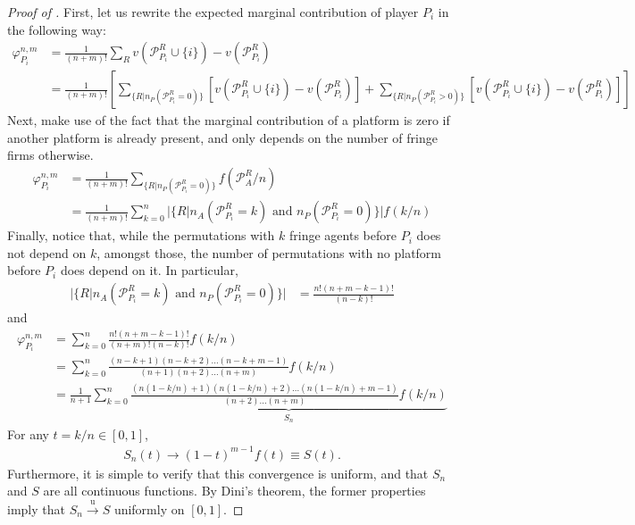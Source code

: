 \documentclass[a4paper]{article}
\begin{document}
\begin{proof}[Proof of ]
    \label{prop:one_sided_multiple}
    First, let us rewrite the expected marginal contribution of player $P_i$ in the following way:
    \begin{align*}
        \varphi_{P_i}^{n, m} &= \frac{1}{(n+m)!} \sum_R v(\mathcal{P}_{P_i}^R \cup \{i\}) - v(\mathcal{P}_{P_i}^R) \\
        &= \frac{1}{(n+m)!} \left[ \sum_{\{R | n_P(\mathcal{P}_{P_i}^R = 0)\}} \left[v(\mathcal{P}_{P_i}^R \cup \{i\}) - v(\mathcal{P}_{P_i}^R)\right] + \sum_{\{R | n_P(\mathcal{P}_{P_i}^R > 0)\}} \left[v(\mathcal{P}_{P_i}^R \cup \{i\}) - v(\mathcal{P}_{P_i}^R)\right] \right]
    \end{align*}
    Next, make use of the fact that the marginal contribution of a platform is zero if another platform is already present, and only depends on the number of fringe firms otherwise.
    \begin{align*}
        \varphi_{P_i}^{n, m} &= \frac{1}{(n+m)!} \sum_{\{R | n_P(\mathcal{P}_{P_i}^R = 0)\}} f (\mathcal{P}_{A}^R / n) \\
        &= \frac{1}{(n+m)!} \sum_{k=0}^n |\{R | n_A(\mathcal{P}^R_{P_i} = k) \text{ and } n_P(\mathcal{P}^R_{P_i} = 0)\}| f(k/n)
    \end{align*}
    Finally, notice that, while the permutations with $k$ fringe agents before $P_i$ does not depend on $k$, amongst those, the number of permutations with no platform before $P_i$ does depend on it.
    In particular,
    \begin{align*}
        |\{R | n_A(\mathcal{P}^R_{P_i} = k) \text{ and } n_P(\mathcal{P}^R_{P_i} = 0)\}| &= \frac{n!(n+m-k-1)!}{(n-k)!}
    \end{align*}
    and
    \begin{align*}
        \varphi_{P_i}^{n, m} &= \sum_{k=0}^n \frac{n!(n+m-k-1)!}{(n+m)!(n-k)!} f(k/n) \\
        &= \sum_{k=0}^n \frac{(n-k+1)(n-k+2) \dots (n-k+m-1)}{(n+1)(n+2) \dots (n+m)} f(k/n) \\
        &= \frac{1}{n+1}\sum_{k=0}^n \underbrace{\frac{(n(1-k/n)+1)(n(1-k/n)+2) \dots (n(1-k/n)+m-1)}{(n+2) \dots (n+m)} f(k/n)}_{S_n}
    \end{align*}
    For any $t = k/n \in [0, 1]$, 
    \begin{align*}
        S_n(t) \to (1-t)^{m-1}f(t) \equiv S(t).
    \end{align*}
    Furthermore, it is simple to verify that this convergence is uniform, and that $S_n$ and $S$ are all continuous functions.
    By Dini's theorem, the former properties imply that $S_n \xrightarrow[]{\mathrm{u}} S$ uniformly on $[0, 1]$.


\end{proof}
\end{document}
